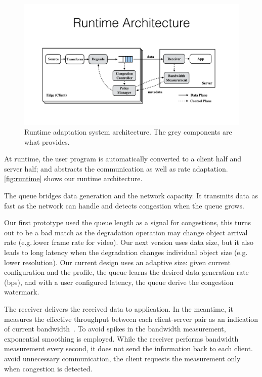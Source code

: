 \begin{figure}
  \centering
  \includegraphics[width=\linewidth]{figures/runtime-adaptation.pdf}
  \caption{Runtime adaptation system architecture. The grey components are what
    \sysname{} provides.}
  \label{fig:runtime}
\end{figure}

At runtime, the user program is automatically converted to a client half and
server half; and \sysname{} abstracts the communication as well as rate
adaptation. \autoref{fig:runtime} shows our runtime architecture.

 The queue bridges data generation and
the network capacity. It transmits data as fast as the network can handle and
detects congestion when the queue grows.

 Our first prototype used the queue length as a
signal for congestions, this turns out to be a bad match as the degradation
operation may change object arrival rate (e.g.\,lower frame rate for video). Our
next version uses data size, but it also leads to long latency when the
degradation changes individual object size (e.g.\,lower resolution). Our current
design uses an adaptive size: given current configuration and the profile, the
queue learns the desired data generation rate (bps), and with a user configured
latency, the queue derive the congestion watermark.

 The receiver delivers the received data to
application. In the meantime, it measures the effective throughput between each
client-server pair as an indication of current bandwidth~\cite{iperf}. To avoid
spikes in the bandwidth measurement, exponential smoothing is employed. While
the receiver performs bandwidth measurement every second, it does not send the
information back to each client.  avoid unnecessary communication, the client
requests the measurement only when congestion is detected.

